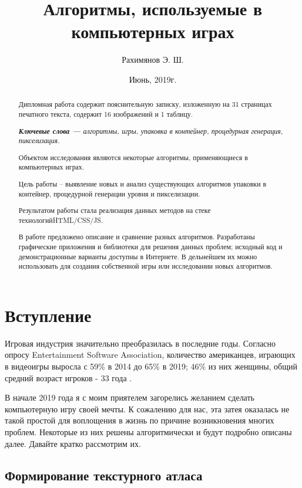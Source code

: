 \documentclass[a4paper,12pt]{report}
\title{Алгоритмы, используемые в компьютерных играх}
\author{Рахимянов Э. Ш.}
\date{Июнь, 2019г.}
\begin{document}
\maketitle

\begin{abstract}
Дипломная работа содержит пояснительную записку,
изложенную на 31 страницах печатного текста, содержит 16 изображений и 1 таблицу.

\textit{\textbf{Ключевые слова --- }алгоритмы, игры, упаковка в контейнер, процедурная генерация, пикселизация.}

Объектом исследования являются некоторые алгоритмы, применяющиеся в компьютерных играх.

Цель работы – выявление новых и анализ существующих алгоритмов упаковки в контейнер, процедурной генерации уровня и пикселизации.

Результатом работы стала реализация данных методов на стеке технологий\newline HTML/CSS/JS.

В работе предложено описание и сравнение разных алгоритмов. Разработаны графические приложения и библиотеки для решения данных проблем; исходный код и демонстрационные варианты доступны в Интернете. В дельнейшем их можно использовать для создания собственной игры или исследовании новых алгоритмов.
\end{abstract}

\tableofcontents

\chapter{Вступление}

\parindent=1cm
Игровая индустрия значительно преобразилась в последние годы. Согласно опросу Entertainment Software Association, количество американцев, играющих в видеоигры выросла с 59\% в 2014 до 65\% в 2019; 46\% из них женщины, общий средний возраст игроков - 33 года \citep{esa_old}\citep{esa}.

В начале 2019 года я с моим приятелем загорелись желанием сделать компьютерную игру своей мечты. К сожалению для нас, эта затея оказалась не такой простой для воплощения в жизнь по причине возникновения многих проблем. Некоторые из них решены алгоритмически и будут подробно описаны далее. Давайте кратко рассмотрим их.

\section{Формирование текстурного атласа}
\end{document}
